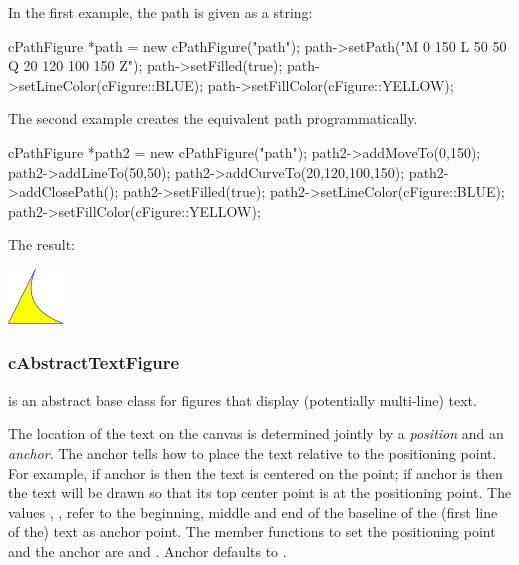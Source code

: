 In the first example, the path is given as a string:


\begin{cpp}
cPathFigure *path = new cPathFigure("path");
path->setPath("M 0 150 L 50 50 Q 20 120 100 150 Z");
path->setFilled(true);
path->setLineColor(cFigure::BLUE);
path->setFillColor(cFigure::YELLOW);
\end{cpp}


The second example creates the equivalent path programmatically.

\begin{cpp}
cPathFigure *path2 = new cPathFigure("path");
path2->addMoveTo(0,150);
path2->addLineTo(50,50);
path2->addCurveTo(20,120,100,150);
path2->addClosePath();
path2->setFilled(true);
path2->setLineColor(cFigure::BLUE);
path2->setFillColor(cFigure::YELLOW);
\end{cpp}


The result:

\begin{center}
\includegraphics[scale=4.0]{figures/figure-path}
\end{center}

\subsubsection{cAbstractTextFigure}

 is an abstract base class for figures that
display (potentially multi-line) text.

The location of the text on the canvas is determined jointly by a
\textit{position} and an \textit{anchor}. The anchor tells how to
place the text relative to the positioning point. For example,
if anchor is  then the text is centered on the point;
if anchor is  then the text will be drawn so that its top
center point is at the positioning point. The values
, ,
 refer to the beginning, middle and end of the
baseline of the (first line of the) text as anchor point. The member
functions to set the positioning point and the anchor are
 and . Anchor defaults to
.

